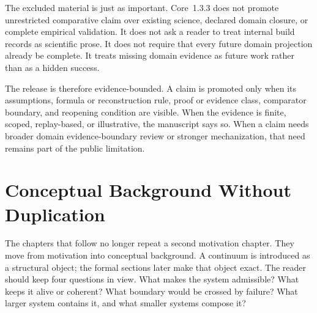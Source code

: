 The excluded material is just as important. Core~1.3.3 does not promote
unrestricted comparative claim over existing science, declared domain closure, or
complete empirical validation. It does not ask a reader to treat internal build
records as scientific prose. It does not require that every future domain
projection already be complete. It treats missing domain evidence as future
work rather than as a hidden success.

The release is therefore evidence-bounded. A claim is promoted only when its
assumptions, formula or reconstruction rule, proof or evidence class,
comparator boundary, and reopening condition are visible. When the evidence is
finite, scoped, replay-based, or illustrative, the manuscript says so. When a
claim needs broader domain evidence-boundary review or stronger mechanization, that need
remains part of the public limitation.

\section{Conceptual Background Without Duplication}
\label{sec:r008-conceptual-background}

The chapters that follow no longer repeat a second motivation chapter. They
move from motivation into conceptual background. A continuum is introduced as a
structural object; the formal sections later make that object exact. The reader
should keep four questions in view. What makes the system admissible? What keeps
it alive or coherent? What boundary would be crossed by failure? What larger
system contains it, and what smaller systems compose it?


